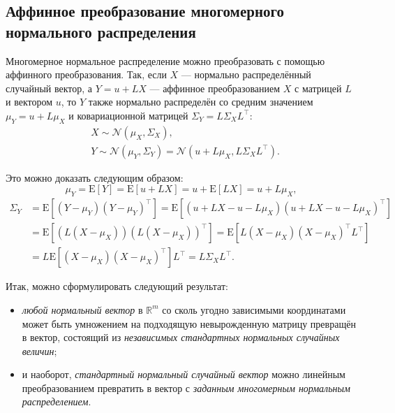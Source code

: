 \documentclass[11pt,a4paper]{article}
\providecommand{\tightlist}{%
      \setlength{\itemsep}{0pt}\setlength{\parskip}{0pt}}
\begin{document}
    \hypertarget{ux430ux444ux444ux438ux43dux43dux43eux435-ux43fux440ux435ux43eux431ux440ux430ux437ux43eux432ux430ux43dux438ux435-ux43cux43dux43eux433ux43eux43cux435ux440ux43dux43eux433ux43e-ux43dux43eux440ux43cux430ux43bux44cux43dux43eux433ux43e-ux440ux430ux441ux43fux440ux435ux434ux435ux43bux435ux43dux438ux44f}{%
\subsection{Аффинное преобразование многомерного нормального
распределения}\label{ux430ux444ux444ux438ux43dux43dux43eux435-ux43fux440ux435ux43eux431ux440ux430ux437ux43eux432ux430ux43dux438ux435-ux43cux43dux43eux433ux43eux43cux435ux440ux43dux43eux433ux43e-ux43dux43eux440ux43cux430ux43bux44cux43dux43eux433ux43e-ux440ux430ux441ux43fux440ux435ux434ux435ux43bux435ux43dux438ux44f}}

Многомерное нормальное распределение можно преобразовать с помощью
аффинного преобразования. Так, если \(X\) --- нормально распределённый
случайный вектор, а \(Y = u + LX\) --- аффинное преобразованием \(X\) с
матрицей \(L\) и вектором \(u\), то \(Y\) также нормально распределён со
средним значением \(\mu_{Y} = u + L\mu_{X}\) и ковариационной матрицей
\(\Sigma_{Y} = L\Sigma_{X}L^\top\):
\[
\begin{split}
  &X \sim \mathcal{N}(\mu_{X}, \Sigma_{X}),\\
  &Y \sim \mathcal{N}(\mu_{Y}, \Sigma_{Y}) = \mathcal{N}(u + L\mu_{X}, L\Sigma_{X}L^\top).
\end{split}
\]

Это можно доказать следующим образом: \[
  \mu_{Y} = \mathrm{E}[Y] = \mathrm{E}[u + LX] = u + \mathrm{E}[LX] = u + L\mu_{X},
\]
\[
\begin{split}
  \Sigma_{Y} &= \mathrm{E}[(Y-\mu_{Y})(Y-\mu_{Y})^\top]
              = \mathrm{E}[(u+LX - u-L\mu_{X})(u+LX - u-L\mu_{X})^\top] \\
             &= \mathrm{E}[(L(X-\mu_{X})) (L(X-\mu_{X}))^\top]
              = \mathrm{E}[L(X-\mu_{X}) (X-\mu_{X})^\top L^\top] \\
             &= L\mathrm{E}[(X-\mu_{X})(X-\mu_{X})^\top]L^\top
              = L\Sigma_{X}L^\top.
\end{split}
\]

    Итак, можно сформулировать следующий результат:

\begin{itemize}
\tightlist
\item
  \emph{любой нормальный вектор} в \(\mathbb{R}^m\) со сколь угодно
  зависимыми координатами может быть умножением на подходящую
  невырожденную матрицу превращён в вектор, состоящий из
  \emph{независимых стандартных нормальных случайных величин};
\item
  и наоборот, \emph{стандартный нормальный случайный вектор} можно
  линейным преобразованием превратить в вектор с \emph{заданным
  многомерным нормальным распределением}.
\end{itemize}
\end{document}
